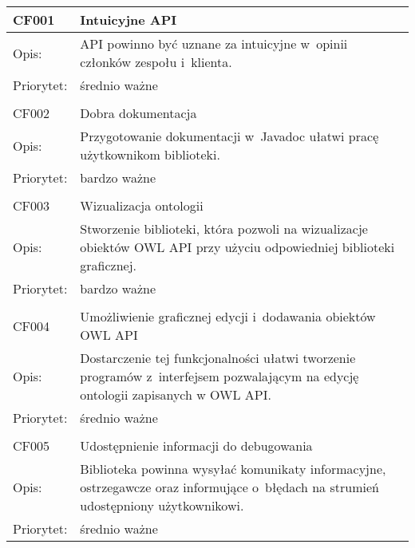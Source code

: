 \begin{center}

\begin{longtable}{|m{3cm}|m{9cm}|} \hline

CF001 & Intuicyjne API \\ \hline
Opis: & API powinno być uznane za intuicyjne w~opinii członków zespołu i~klienta. \\ \hline
Priorytet: & średnio ważne  \\ \hline
\multicolumn{2}{c}{} \\

 \hline
CF002 & Dobra dokumentacja \\ \hline
Opis: & Przygotowanie dokumentacji w~Javadoc ułatwi pracę użytkownikom biblioteki. \\ \hline
Priorytet: & bardzo ważne \\ \hline

\multicolumn{2}{c}{} \\
 \hline
CF003 & Wizualizacja ontologii \\ \hline
Opis: & Stworzenie biblioteki, która pozwoli na wizualizacje obiektów OWL API przy użyciu odpowiedniej biblioteki graficznej. \\ \hline
Priorytet: & bardzo ważne \\ \hline

\multicolumn{2}{c}{} \\
 \hline
CF004 & Umożliwienie graficznej edycji i~dodawania obiektów OWL API \\ \hline
Opis: &  Dostarczenie tej funkcjonalności ułatwi tworzenie programów z~interfejsem pozwalającym na edycję ontologii zapisanych w OWL API. \\ \hline
Priorytet: & średnio ważne \\ \hline
\multicolumn{2}{c}{} \\


 \hline

CF005 & Udostępnienie informacji do debugowania  \\ \hline
Opis: &  Biblioteka powinna wysyłać komunikaty informacyjne, ostrzegawcze oraz informujące o~błędach na strumień udostępniony użytkownikowi.  \\ \hline
Priorytet: & średnio ważne \\ \hline

\end{longtable}

\end{center}

